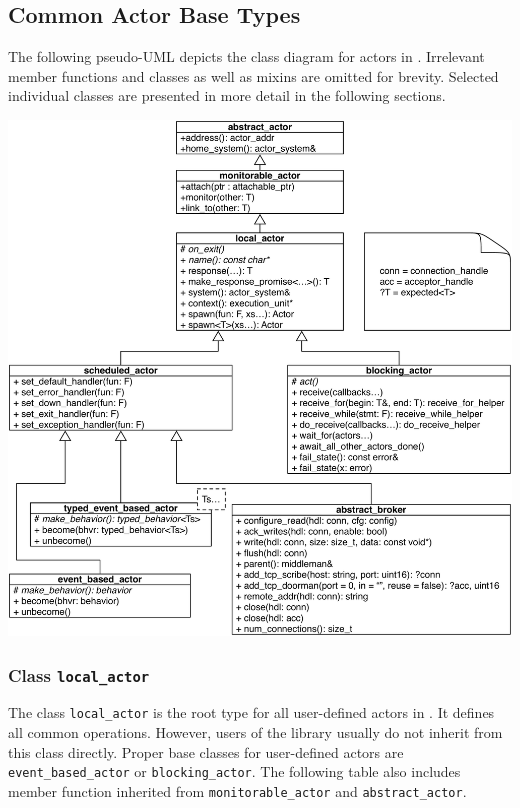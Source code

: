 \clearpage
\subsection{Common Actor Base Types}

The following pseudo-UML depicts the class diagram for actors in \lib. Irrelevant member functions and classes as well as mixins are omitted for brevity. Selected individual classes are presented in more detail in the following sections.

\includegraphics[width=\textwidth]{actor_types}

\clearpage
\subsubsection{Class \lstinline^local_actor^}

The class \lstinline^local_actor^ is the root type for all user-defined actors in \lib. It defines all common operations.
However, users of the library usually do not inherit from this class directly. Proper base classes for user-defined actors are \lstinline^event_based_actor^ or \lstinline^blocking_actor^. The following table also includes member function inherited from \lstinline^monitorable_actor^ and \lstinline^abstract_actor^.

